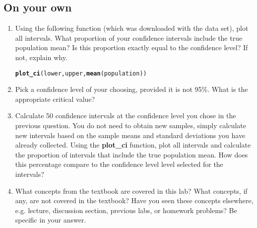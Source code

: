 \documentclass{article}\usepackage[]{graphicx}\usepackage[]{color}
\makeatletter
\newcommand{\hlstd}[1]{\textcolor[rgb]{0.345,0.345,0.345}{#1}}%
\newcommand{\hlkwd}[1]{\textcolor[rgb]{0.737,0.353,0.396}{\textbf{#1}}}%
\newenvironment{kframe}{%
 \def\at@end@of@kframe{}%
 \ifinner\ifhmode%
  \def\at@end@of@kframe{\end{minipage}}%
  \begin{minipage}{\columnwidth}%
 \fi\fi%
 \def\FrameCommand##1{\hskip\@totalleftmargin \hskip-\fboxsep
 \colorbox{shadecolor}{##1}\hskip-\fboxsep
     \hskip-\linewidth \hskip-\@totalleftmargin \hskip\columnwidth}%
 \MakeFramed {\advance\hsize-\width
   \@totalleftmargin\z@ \linewidth\hsize
   \@setminipage}}%
 {\par\unskip\endMakeFramed%
 \at@end@of@kframe}
\newenvironment{knitrout}{}{} %
\makeatother
\begin{document}
\subsection*{On your own}

\begin{enumerate}

\item Using the following function (which was downloaded with the data set), plot all intervals. What proportion of your confidence intervals include the true population mean? Is this proportion exactly equal to the confidence level? If not, explain why.

\begin{knitrout}
\color{fgcolor}\begin{kframe}
\begin{alltt}
\hlkwd{plot_ci}\hlstd{(lower, upper,} \hlkwd{mean}\hlstd{(population))}
\end{alltt}
\end{kframe}
\end{knitrout}


\item Pick a confidence level of your choosing, provided it is not 95\%. What is the appropriate critical value?

\item Calculate 50 confidence intervals at the confidence level you chose in the previous question. You do not need to obtain new samples, simply calculate new intervals based on the sample means and standard deviations you have already collected. Using the \hlkwd{plot\_ci} function, plot all intervals and calculate the proportion of intervals that include the true population mean. How does this percentage compare to the confidence level level selected for the intervals?

\item What concepts from the textbook are covered in this lab?  What concepts, if any, are not covered in the textbook?  Have you seen these concepts elsewhere, e.g. lecture, discussion section, previous labs, or homework problems?  Be specific in your answer.

\end{enumerate}
  
  
\end{document}
